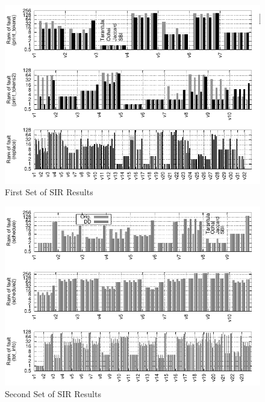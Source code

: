 
\begin{figure}
  \centering
  \includegraphics[width=1.8\columnwidth]{siemens1}
  \caption{First Set of SIR Results}
  \label{fig:allSIR1}
\end{figure}

\begin{figure}
  \centering
  \includegraphics[width=1.8\columnwidth]{siemens2}
  \caption{Second Set of SIR Results}
  \label{fig:allSIR2}
\end{figure}


